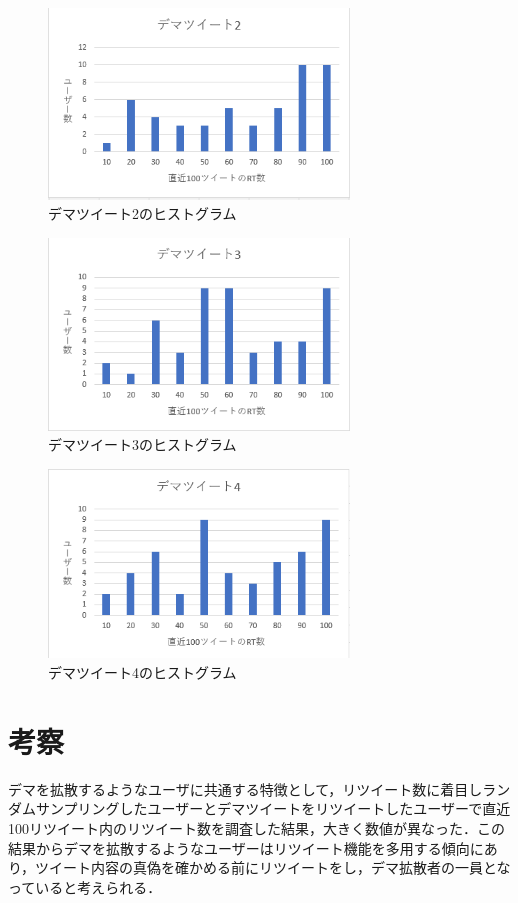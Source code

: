 \documentclass[uplatex,twocolumn]{jsarticle}
\begin{document}
\begin{figure}[htbp]
\centering
\includegraphics[clip,width=8.0cm]{d2.png}
\caption{デマツイート2のヒストグラム}
\label{ヒストグラム2}
\end{figure}

\begin{figure}[htbp]
\centering
\includegraphics[clip,width=8.0cm]{d3.png}
\caption{デマツイート3のヒストグラム}
\label{ヒストグラム3}
\end{figure}

\begin{figure}[h]
\centering
\includegraphics[clip,width=8.0cm]{d4.png}
\caption{デマツイート4のヒストグラム}
\label{ヒストグラム4}
\end{figure}

\section{考察}
デマを拡散するようなユーザに共通する特徴として，リツイート数に着目しランダムサンプリングしたユーザーとデマツイートをリツイートしたユーザーで直近100リツイート内のリツイート数を調査した結果，大きく数値が異なった．この結果からデマを拡散するようなユーザーはリツイート機能を多用する傾向にあり，ツイート内容の真偽を確かめる前にリツイートをし，デマ拡散者の一員となっていると考えられる．
\end{document}
